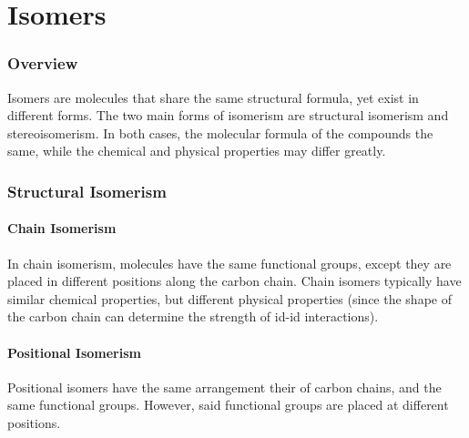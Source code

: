 

\pagebreak
\part{Isomers}
\hypertarget{ChapterIsomers}{}

	\section{Overview}

	Isomers are molecules that share the same structural formula, yet exist in different forms. The two main
	forms of isomerism are structural isomerism and stereoisomerism. In both cases, the molecular formula of the
	compounds the same, while the chemical and physical properties may differ greatly.


	\section{Structural Isomerism}

		\subsection{Chain Isomerism}

			In chain isomerism, molecules have the same functional groups, except they are placed in different positions
			along the carbon chain. Chain isomers typically have similar chemical properties, but different physical
			properties (since the shape of the carbon chain can determine the strength of id-id interactions).





		\subsection{Positional Isomerism}
			Positional isomers have the same arrangement their of carbon chains, and the same functional groups. However, said
			functional groups are placed at different positions.


